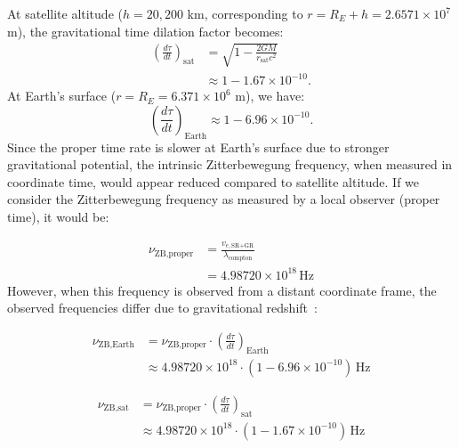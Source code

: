 \documentclass[%
 reprint,
 amsmath,amssymb,
 aps,
]{revtex4-1}
\numberwithin{equation}{section}%
\begin{document}
At satellite altitude ($h = 20,200$ km, corresponding to $r = R_E + h = 2.6571 \times 10^7$ m), the gravitational time dilation factor becomes:
\begin{equation}
\begin{aligned}
\left( \frac{d\tau}{dt} \right)_{\text{sat}} &= \sqrt{1 - \frac{2GM}{r_{\text{sat}}c^2}} \\
&\approx 1 - 1.67 \times 10^{-10}.
\end{aligned}
\end{equation}
At Earth's surface ($r = R_E = 6.371 \times 10^6$ m), we have:
\begin{equation}
\left( \frac{d\tau}{dt} \right)_{\text{Earth}} \approx 1 - 6.96 \times 10^{-10}.
\end{equation}
Since the proper time rate is slower at Earth's surface due to stronger gravitational potential, the intrinsic Zitterbewegung frequency, when measured in coordinate time, would appear reduced compared to satellite altitude. If we consider the Zitterbewegung frequency as measured by a local observer (proper time), it would be:

\begin{equation}
\begin{aligned}
\nu_{\text{ZB,proper}} &= \frac{v_{e,\text{SR+GR}}}{\lambda_{\mathrm{compton}}} \\
&= 4.98720 \times 10^{18} \, \text{Hz}
\end{aligned}
\end{equation}
However, when this frequency is observed from a distant coordinate frame, the observed frequencies differ due to gravitational redshift~\cite{pound1960}:

\begin{equation}
\begin{aligned}
\nu_{\text{ZB,Earth}} &= \nu_{\text{ZB,proper}} \cdot \left( \frac{d\tau}{dt} \right)_{\text{Earth}} \\
&\approx 4.98720 \times 10^{18} \cdot (1 - 6.96 \times 10^{-10}) \, \text{Hz}
\end{aligned}
\end{equation}

\begin{equation}
\begin{aligned}
\nu_{\text{ZB,sat}} &= \nu_{\text{ZB,proper}} \cdot \left( \frac{d\tau}{dt} \right)_{\text{sat}} \\
&\approx 4.98720 \times 10^{18} \cdot (1 - 1.67 \times 10^{-10}) \, \text{Hz}
\end{aligned}
\end{equation}
\end{document}
